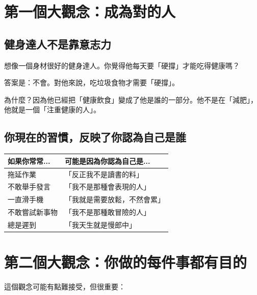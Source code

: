 \documentclass[12pt,a4paper]{article}
\begin{document}
\section{第一個大觀念：成為對的人}

\subsection{健身達人不是靠意志力}

想像一個身材很好的健身達人。你覺得他每天要「硬撐」才能吃得健康嗎？

答案是：不會。對他來說，吃垃圾食物才需要「硬撐」。

為什麼？因為他已經把「健康飲食」變成了他是誰的一部分。他不是在「減肥」，他就是一個「注重健康的人」。

\subsection{你現在的習慣，反映了你認為自己是誰}

\begin{longtable}{p{5cm}p{9cm}}
\toprule
\textbf{如果你常常...} & \textbf{可能是因為你認為自己是...} \\
\midrule
\endfirsthead

\bottomrule
\endfoot

拖延作業 & 「反正我不是讀書的料」 \\
\midrule
不敢舉手發言 & 「我不是那種會表現的人」 \\
\midrule
一直滑手機 & 「我就是需要放鬆，不然會累」 \\
\midrule
不敢嘗試新事物 & 「我不是那種敢冒險的人」 \\
\midrule
總是遲到 & 「我天生就是慢郎中」 \\
\bottomrule
\end{longtable}


\section{第二個大觀念：你做的每件事都有目的}

這個觀念可能有點難接受，但很重要：
\end{document}
